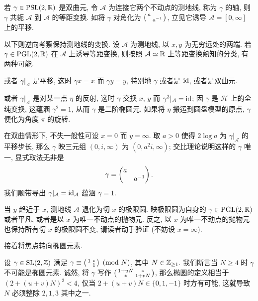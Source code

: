 \begin{example}\label{eg:sliding}
	若 $\gamma \in \operatorname{PSL}(2,\mathbb{R})$ 是双曲元, 令 $\mathcal{A}$ 为连接它两个不动点的测地线, 称为 $\gamma$ 的轴, 则 $\gamma$ 共轭 $\mathcal{A}$ 到 $\mathcal{A}$ 的等距变换. 如将 $\gamma$ 对角化为 $\bigl(\begin{smallmatrix} a &  \\  & a^{-1} \end{smallmatrix}\bigr)$, 立见它诱导 $\mathcal{A} = [0, \infty]$ 上的平移.
	
	以下则逆向考察保持测地线的变换. 设 $\mathcal{A}$ 为测地线, 以 $x,y$ 为无穷远处的两端. 若 $\gamma \in \operatorname{PGL}(2,\mathbb{R})$ 在 $\mathcal{A}$ 上诱导等距变换, 则按照 $\mathcal{A} \simeq \mathbb{R}$ 上等距变换熟知的分类, 有两种可能.
	\begin{compactitem}
		\item 或者 $\gamma|_{\mathcal{A}}$ 是平移, 这时 $\gamma x = x$ 而 $\gamma y = y$, 特别地 $\gamma$ 或者是 $\mathrm{id}$, 或者是双曲元.
		\item 或者 $\gamma|_{\mathcal{A}}$ 是对某一点 $\eta$ 的反射, 这时 $\gamma$ 交换 $x$, $y$ 而 $\gamma^2|_{\mathcal{A}} = \mathrm{id}$; 因 $\gamma$ 是 $\mathcal{H}$ 上的全纯变换, 这蕴涵 $\gamma^2 = 1$, 从而 $\gamma$ 是二阶椭圆元. 如果将 $\eta$ 搬运到圆盘模型的原点, $\gamma$ 便化为角度 $\pi$ 的旋转.
	\end{compactitem}
	在双曲情形下, 不失一般性可设 $x=0$ 而 $y = \infty$. 取 $a > 0$ 使得 $2\log a$ 为 $\gamma|_{\mathcal{A}}$ 的平移步长, 那么 $\gamma$ 映三元组 $(0, i, \infty)$ 为 $(0, a^2 i, \infty)$; 交比理论说明这样的 $\gamma$ 唯一, 显式取法无非是
	\[ \gamma = \begin{pmatrix} a &  \\  & a^{-1} \end{pmatrix}. \]
	我们顺带导出 $\gamma|_{\mathcal{A}} = \mathrm{id}_{\mathcal{A}}$ 蕴涵 $\gamma = 1$.
	\begin{center}\end{center}
	当 $y$ 趋近于 $x$, 测地线 $\mathcal{A}$ 退化为切 $x$ 的极限圆. 映极限圆为自身的 $\gamma \in \operatorname{PGL}(2,\mathbb{R})$ 或者平凡, 或者是以 $x$ 为唯一不动点的抛物元. 反之, 以 $x$ 为唯一不动点的抛物元也保持所有切 $x$ 的极限圆不变, 请读者动手验证 (不妨设 $x = \infty$).
\end{example}

接着将焦点转向椭圆元素.
\begin{example}\label{eg:Gamma1-neat}
	设 $\gamma \in \operatorname{SL}(2,\mathbb{Z})$ 满足 $\gamma \equiv \bigl(\begin{smallmatrix} 1 & * \\  & 1 \end{smallmatrix}\bigr) \pmod{N}$, 其中 $N \in \mathbb{Z}_{\geq 1}$. 我们断言当 $N \geq 4$ 时 $\gamma$ 不可能是椭圆元素. 诚然, 将 $\gamma$ 写作 $\bigl(\begin{smallmatrix} 1 + uN & * \\ * & 1 + vN \end{smallmatrix}\bigr)$, 那么椭圆的定义相当于 $(2 + (u+v)N)^2 < 4$, 仅当 $2 + (u+v)N \in \{0, 1, -1\}$ 时方有可能, 这就导致 $N$ 必须整除 $2,1,3$ 其中之一.
\end{example}

